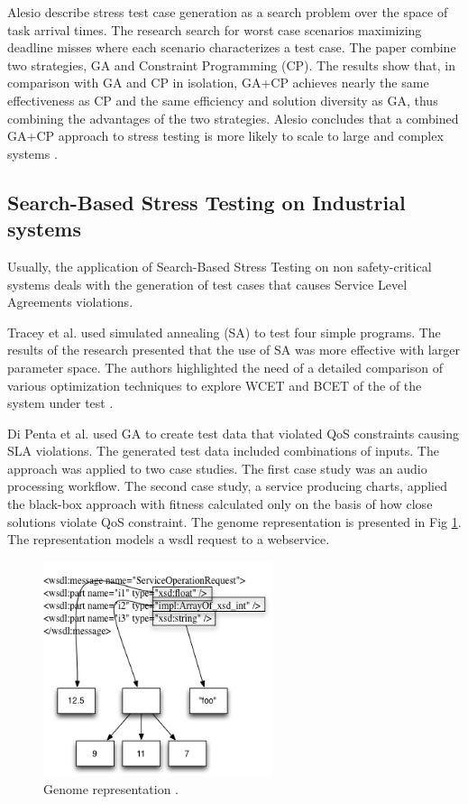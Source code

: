 Alesio describe stress test case generation as a search problem over the space of task arrival times. The research search for worst case scenarios maximizing deadline misses where each scenario characterizes a test case. The paper combine two strategies, GA and Constraint Programming (CP). The results show that, in comparison with GA and CP in isolation, GA+CP achieves nearly the same effectiveness as CP and the same efficiency and solution diversity as GA, thus combining the advantages of the two strategies. Alesio concludes that a combined GA+CP approach to stress testing is more likely to scale to large and complex systems \cite{Alesio2015}.

\subsection{Search-Based Stress Testing on Industrial systems} 

Usually, the application of Search-Based Stress Testing on non safety-critical systems deals with the generation of test cases that causes Service Level Agreements violations.


Tracey et al. \cite{Tracey1998} used simulated annealing (SA) to test four
simple programs. The results of the research presented that the use of SA was more effective with larger parameter space. The authors highlighted the need of a detailed comparison of various optimization techniques to explore WCET and BCET of the of the system under test \cite{Tracey1998}.

Di Penta et al. \cite{Penta2007} used GA to create test data that violated QoS constraints causing SLA violations. The generated test data included combinations of inputs. The approach was applied to two case studies. The first case study was an audio processing workflow. The second case study, a service producing charts, applied the black-box approach with fitness calculated only on the basis of how close solutions violate QoS constraint. The genome representation is presented in Fig \ref{fig:dipenta}. The representation models a wsdl request to a webservice.

\begin{figure}[h]
\centering
\includegraphics[width=0.6\textwidth]{./images/dipenta.png}
\caption{Genome representation \cite{Penta2007}. }
\label{fig:dipenta}
\end{figure}




